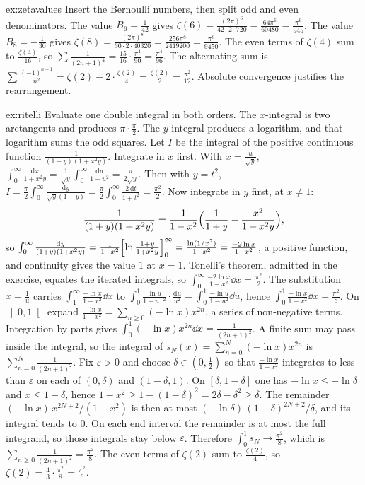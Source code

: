 \begin{solution}{ex:zetavalues}
\idea Insert the Bernoulli numbers, then split odd and even denominators.
\writeup The value $B_6=\frac1{42}$ gives $\zeta(6)=\frac{(2\pi)^6}{42\cdot2\cdot720}=\frac{64\pi^6}{60480}=\frac{\pi^6}{945}$. The value $B_8=-\frac1{30}$ gives
$\zeta(8)=\frac{(2\pi)^8}{30\cdot2\cdot40320}=\frac{256\pi^8}{2419200}=\frac{\pi^8}{9450}$. The even terms of $\zeta(4)$ sum to $\frac{\zeta(4)}{16}$, so
$\sum\frac1{(2n+1)^4}=\frac{15}{16}\cdot\frac{\pi^4}{90}=\frac{\pi^4}{96}$. The alternating sum is $\sum\frac{(-1)^{n-1}}{n^2}=\zeta(2)-2\cdot\frac{\zeta(2)}4=\frac{\zeta(2)}2=\frac{\pi^2}{12}$. Absolute convergence justifies the rearrangement.
\end{solution}

\begin{solution}{ex:ritelli}
\idea Evaluate one double integral in both orders. The $x$-integral is two arctangents and produces $\pi\cdot\frac\pi2$. The $y$-integral produces a logarithm, and that logarithm sums the odd squares.
\writeup Let $I$ be the integral of the positive continuous function $\frac1{(1+y)(1+x^2y)}$. Integrate in $x$ first. With
$x=\frac u{\sqrt y}$, $\int_0^\infty\frac{\mathrm dx}{1+x^2y}=\frac1{\sqrt y}\int_0^\infty\frac{\mathrm du}{1+u^2}=\frac\pi{2\sqrt y}$. Then with $y=t^2$,
$I=\frac\pi2\int_0^\infty\frac{\mathrm dy}{\sqrt y(1+y)}=\frac\pi2\int_0^\infty\frac{2\,\mathrm dt}{1+t^2}=\frac{\pi^2}2$. Now integrate in $y$ first, at $x\ne1$:
\[
\frac1{(1+y)(1+x^2y)}=\frac1{1-x^2}\Bigl(\frac1{1+y}-\frac{x^2}{1+x^2y}\Bigr),
\]
so $\int_0^\infty\frac{\mathrm dy}{(1+y)(1+x^2y)}=\frac1{1-x^2}\Bigl[\ln\frac{1+y}{1+x^2y}\Bigr]_0^\infty=\frac{\ln(1/x^2)}{1-x^2}=\frac{-2\ln x}{1-x^2}$, a
positive function, and continuity gives the value $1$ at $x=1$. Tonelli's theorem, admitted in the exercise, equates the iterated integrals, so $\int_0^\infty\frac{-2\ln x}{1-x^2}\dd x=\frac{\pi^2}2$. The substitution $x=\frac1u$ carries $\int_1^\infty\frac{-\ln x}{1-x^2}\dd x$ to $\int_0^1\frac{\ln u}{1-u^{-2}}\cdot\frac{\mathrm du}{u^2}=\int_0^1\frac{-\ln u}{1-u^2}\dd u$, hence
$\int_0^1\frac{-\ln x}{1-x^2}\dd x=\frac{\pi^2}8$. On $\left]0,1\right[$ expand $\frac{-\ln x}{1-x^2}=\sum_{n\ge0}(-\ln x)x^{2n}$, a series of non-negative terms. Integration by parts gives $\int_0^1(-\ln x)x^{2n}\dd x=\frac1{(2n+1)^2}$. A finite sum may pass inside the integral, so
the integral of $s_N(x)=\sum_{n=0}^N(-\ln x)x^{2n}$ is $\sum_{n=0}^N\frac1{(2n+1)^2}$. Fix $\varepsilon>0$ and choose $\delta\in(0,\frac12)$ so that $\frac{-\ln x}{1-x^2}$ integrates to less than $\varepsilon$ on each of $(0,\delta)$ and $(1-\delta,1)$. On $[\delta,1-\delta]$ one has $-\ln x\le-\ln\delta$ and $x\le1-\delta$, hence $1-x^2\ge1-(1-\delta)^2=2\delta-\delta^2\ge\delta$. The remainder $(-\ln x)\,x^{2N+2}/(1-x^2)$ is then at most $(-\ln\delta)\,(1-\delta)^{2N+2}/\delta$, and its integral tends to $0$. On each end interval the remainder is at most the full integrand, so those integrals stay below $\varepsilon$. Therefore $\int_0^1 s_N\to\frac{\pi^2}8$, which is $\sum_{n\ge0}\frac1{(2n+1)^2}=\frac{\pi^2}8$. The even terms of $\zeta(2)$ sum to $\frac{\zeta(2)}4$, so $\zeta(2)=\frac43\cdot\frac{\pi^2}8=\frac{\pi^2}6$.
\end{solution}

